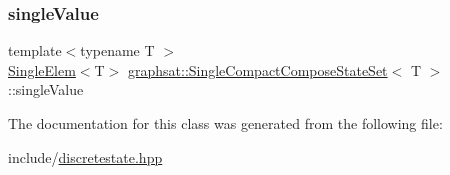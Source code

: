 \subsubsection{\texorpdfstring{singleValue}{singleValue}}
{\footnotesize\ttfamily template$<$typename T $>$ \\
\mbox{\hyperlink{classgraphsat_1_1_single_elem}{Single\+Elem}}$<$T$>$ \mbox{\hyperlink{classgraphsat_1_1_single_compact_compose_state_set}{graphsat\+::\+Single\+Compact\+Compose\+State\+Set}}$<$ T $>$\+::single\+Value\hspace{0.3cm}{\ttfamily [private]}}



The documentation for this class was generated from the following file\+:\begin{DoxyCompactItemize}
\item 
include/\mbox{\hyperlink{discretestate_8hpp}{discretestate.\+hpp}}\end{DoxyCompactItemize}
